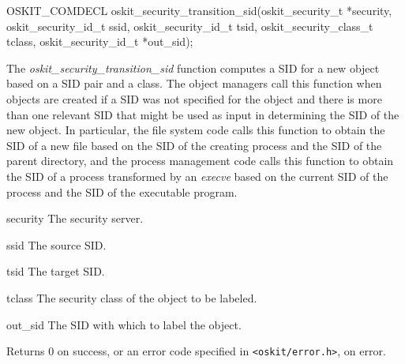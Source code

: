 \begin{apisyn}

	\funcproto OSKIT_COMDECL
	oskit_security_transition_sid(oskit_security_t *security, 
		          oskit_security_id_t ssid,
			  oskit_security_id_t tsid,
                          oskit_security_class_t tclass,
			\outparam oskit_security_id_t *out_sid);
\end{apisyn}
\begin{apidesc}

The \emph{oskit\_security\_transition\_sid} function computes a SID for a new
object based on a SID pair and a class.  The object managers
call this function when objects are created if a SID was not specified
for the object and there is more than one relevant SID that might be
used as input in determining the SID of the new object.  In 
particular, the file system code calls this function to obtain the SID
of a new file based on the SID of the creating process and the SID of
the parent directory, and the process management code calls this
function to obtain the SID of a process transformed by an
\emph{execve} based on the current SID of the process and the SID of
the executable program.

\end{apidesc}
\begin{apiparm}
	\item[security]
		The security server.
	\item[ssid]
		The source SID.
	\item[tsid]
		The target SID.
	\item[tclass]
		The security class of the object to be labeled.
	\item[out_sid]
		The SID with which to label the object.
\end{apiparm}
\begin{apiret}
	Returns 0 on success, or an error code specified in
	{\tt <oskit/error.h>}, on error.
\end{apiret}


